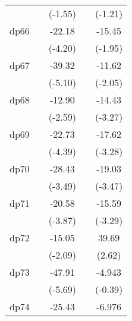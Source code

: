 {\begin{tabular}{l*{4}{c}}
            &                     &     (-1.55)         &                     &     (-1.21)         \\
[1em]
dp66        &                     &      -22.18\sym{***}&                     &      -15.45         \\
            &                     &     (-4.20)         &                     &     (-1.95)         \\
[1em]
dp67        &                     &      -39.32\sym{***}&                     &      -11.62\sym{*}  \\
            &                     &     (-5.10)         &                     &     (-2.05)         \\
[1em]
dp68        &                     &      -12.90\sym{**} &                     &      -14.43\sym{**} \\
            &                     &     (-2.59)         &                     &     (-3.27)         \\
[1em]
dp69        &                     &      -22.73\sym{***}&                     &      -17.62\sym{**} \\
            &                     &     (-4.39)         &                     &     (-3.28)         \\
[1em]
dp70        &                     &      -28.43\sym{***}&                     &      -19.03\sym{***}\\
            &                     &     (-3.49)         &                     &     (-3.47)         \\
[1em]
dp71        &                     &      -20.58\sym{***}&                     &      -15.59\sym{**} \\
            &                     &     (-3.87)         &                     &     (-3.29)         \\
[1em]
dp72        &                     &      -15.05\sym{*}  &                     &       39.69\sym{**} \\
            &                     &     (-2.09)         &                     &      (2.62)         \\
[1em]
dp73        &                     &      -47.91\sym{***}&                     &      -4.943         \\
            &                     &     (-5.69)         &                     &     (-0.39)         \\
[1em]
dp74        &                     &      -25.43         &                     &      -6.976         \\

\end{tabular}}
